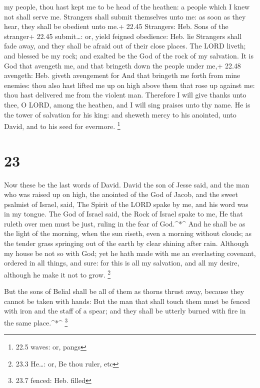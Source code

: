my people, thou hast kept me to be head of the heathen: a people which I
knew not shall serve me.  Strangers shall submit themselves
unto me: as soon as they hear, they shall be obedient unto me.+ 22.45
Strangers: Heb. Sons of the stranger+ 22.45 submit\ldots: or, yield
feigned obedience: Heb. lie  Strangers shall fade away, and
they shall be afraid out of their close places.  The LORD
liveth; and blessed be my rock; and exalted be the God of the rock of my
salvation.  It is God that avengeth me, and that bringeth
down the people under me,+ 22.48 avengeth: Heb. giveth avengement for
 And that bringeth me forth from mine enemies: thou also
hast lifted me up on high above them that rose up against me: thou hast
delivered me from the violent man.  Therefore I will give
thanks unto thee, O LORD, among the heathen, and I will sing praises
unto thy name.  He is the tower of salvation for his king:
and sheweth mercy to his anointed, unto David, and to his seed for
evermore. \footnote{22.5 waves: or, pangs}

\hypertarget{section-22}{%
\section{23}\label{section-22}}

 Now these be the last words of David. David the son of
Jesse said, and the man who was raised up on high, the anointed of the
God of Jacob, and the sweet psalmist of Israel, said,  The
Spirit of the LORD spake by me, and his word was in my tongue.
 The God of Israel said, the Rock of Israel spake to me, He
that ruleth over men must be just, ruling in the fear of God.\^{}*\^{}
 And he shall be as the light of the morning, when the sun
riseth, even a morning without clouds; as the tender grass springing out
of the earth by clear shining after rain.  Although my house
be not so with God; yet he hath made with me an everlasting covenant,
ordered in all things, and sure: for this is all my salvation, and all
my desire, although he make it not to grow. \footnote{23.3 He\ldots: or,
  Be thou ruler, etc}

 But the sons of Belial shall be all of them as thorns
thrust away, because they cannot be taken with hands:  But
the man that shall touch them must be fenced with iron and the staff of
a spear; and they shall be utterly burned with fire in the same
place.\^{}*\^{} \footnote{23.7 fenced: Heb. filled}

